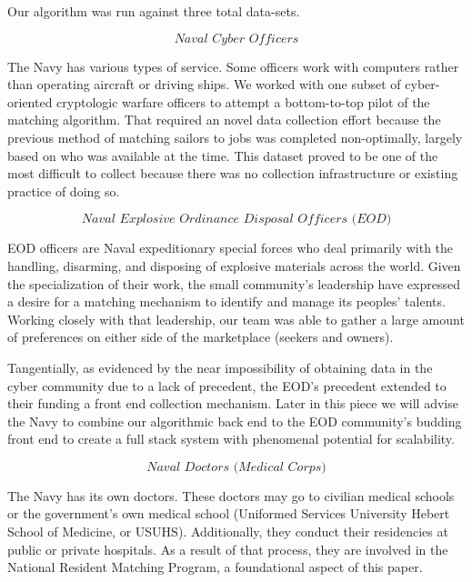 Our algorithm was run against three total data-sets. 


\[\textit{Naval Cyber Officers}\]

The Navy has various types of service.  Some officers work with computers rather than operating aircraft or driving ships. We worked with one subset of cyber-oriented cryptologic warfare officers to attempt a bottom-to-top pilot of the matching algorithm.  That required an novel data collection effort because the previous method of matching sailors to jobs was completed non-optimally, largely based on who was available at the time. This dataset proved to be one of the most difficult to collect because there was no collection infrastructure or existing practice of doing so. 

\[\textit{Naval Explosive Ordinance Disposal Officers (EOD)}\]

EOD officers are Naval expeditionary special forces who deal primarily with the handling, disarming, and disposing of explosive materials across the world. Given the specialization of their work, the small community’s leadership have expressed a desire for a matching mechanism to identify and manage its peoples’ talents.  Working closely with that leadership, our team was able to gather a large amount of preferences on either side of the marketplace (seekers and owners).  

Tangentially, as evidenced by the near impossibility of obtaining data in the cyber community due to a lack of precedent, the EOD’s precedent extended to their funding a front end collection mechanism.  Later in this piece we will advise the Navy to combine our algorithmic back end to the EOD community’s budding front end to create a full stack system with phenomenal potential for scalability.  

\[\textit{Naval Doctors (Medical Corps)}\]

The Navy has its own doctors. These doctors may go to civilian medical schools or the government’s own medical school (Uniformed Services University Hebert School of Medicine, or USUHS).  Additionally, they conduct their residencies at public or private hospitals.  As a result of that process, they are involved in the National Resident Matching Program, a foundational aspect of this paper. 

